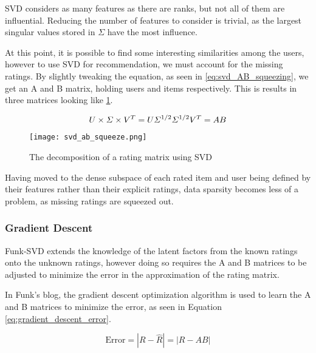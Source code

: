 SVD considers as many features as there are ranks, but not all of them are influential. Reducing the number of features to consider is trivial, as the largest singular values stored in $\Sigma$ have the most influence.

At this point, it is possible to find some interesting similarities among the users, however to use SVD for recommendation, we must account for the missing ratings. By slightly tweaking the equation, as seen in \ref{eq:svd_AB_squeezing}, we get an A and B matrix, holding users and items respectively. This is results in three matrices looking like \ref{fig:svd-ab-squeeze}.

\begin{equation} \label{eq:svd_AB_squeezing}
	\centering
	U\times \Sigma \times V^T = U\Sigma^{1/2} \Sigma^{1/2}V^T = AB
\end{equation}

\begin{figure} [H] \label{fig:svd-ab-squeeze}
	\centering
	\texttt{[image: svd\_ab\_squeeze.png]}
	\caption{The decomposition of a rating matrix using SVD}
\end{figure}
Having moved to the dense subspace of each rated item and user being defined by their features rather than their explicit ratings, data sparsity becomes less of a problem, as missing ratings are squeezed out.

\subsubsection{Gradient Descent}
Funk-SVD extends the knowledge of the latent factors from the known ratings onto the unknown ratings, however doing so requires the A and B matrices to be adjusted to minimize the error in the approximation of the rating matrix.

In Funk's blog, the gradient descent optimization algorithm is used to learn the A and B matrices to minimize the error, as seen in Equation \ref{eq:gradient_descent_error}.

\begin{equation}\label{eq:gradient_descent_error}
\text{Error} = |R-\hat{R}| = |R - AB|
\end{equation}


